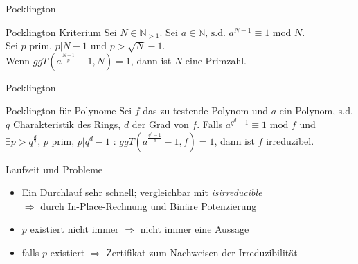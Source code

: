 \documentclass[german,10pt,xcolor=colortbl,compress]{beamer}%
\newcommand{\NN}{\mathbb{N}}
\begin{document}
	
	\begin{frame}{Pocklington}
		\begin{block}{Pocklington Kriterium}
			Sei $N\in \NN_{>1}$. $%
			\text{Sei } a \in \NN \text{, s.d. } a^{N-1} \equiv 1 \text{ mod } N$.\\
			Sei $p$ prim, $p | N-1$ und $p> \sqrt{N}-1$.\\
			Wenn $ggT(a^{\frac{N-1}{p}}-1,N) = 1$, dann ist $N$ eine Primzahl.
		\end{block}
	\end{frame}

		
	\begin{frame}{Pocklington}
		\begin{block}{Pocklington für Polynome}
			Sei $f$ das zu testende Polynom und $a$ ein Polynom, s.d. 
			$q$ Charakteristik des Rings, $d$ der Grad von $f$.
			Falls $a^{q^{d}-1}\equiv 1 \text{ mod }f$ und 
			$\exists p > q^{\frac{d}{2}} \text{, } p \text{ prim, } p|q^{d}-1 $ : $ggT(a^{\frac{q^{d}-1}{p}}-1, f)=1$, dann ist $f$ irreduzibel. 
		\end{block}
	
	\end{frame}


	\begin{frame}{Laufzeit und Probleme}
		\begin{itemize}
		\item Ein Durchlauf sehr schnell; vergleichbar mit \textit{isirreducible} \\
		$\Rightarrow$ durch In-Place-Rechnung und Binäre Potenzierung
		
		\item $p$ existiert nicht immer $\Rightarrow$ nicht immer eine Aussage
		\item falls $p$ existiert $\Rightarrow$ Zertifikat zum Nachweisen der Irreduzibilität 
		\end{itemize}	
		
	\end{frame}
\end{document}
